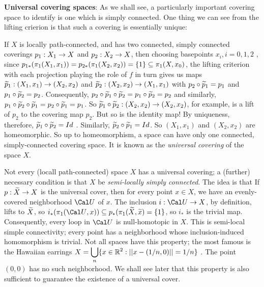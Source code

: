 \bsk

{\bf Universal covering spaces}: As we shall see, a particularly
important covering space to identify is one which is simply
connected. One thing we can see from the lifting crierion is
that such a covering is essentially unique:

\msk

If $X$ is locally path-connected, and has two connected, simply connected
coverings $p_1:X_1\rightarrow X$ and $p_2:X_2\rightarrow X$, then choosing
basepoints $x_i, i=0,1,2$ , since 
$p_{1*}(\pi_1(X_1,x_1)) = p_{2*}(\pi_1(X_2,x_2))=\{1\}\subseteq \pi_1(X,x_0)$,
the lifting criterion with each projection playing the role of $f$ in turn
gives us maps $\widetilde{p}_1:(X_1,x_1)\rightarrow (X_2,x_2)$ and 
$\widetilde{p}_2:(X_2,x_2)\rightarrow (X_1,x_1)$ with $p_2\circ\widetilde{p}_1=p_1$
and $p_1\circ\widetilde{p}_2=p_2$. Consequently, 
$p_2\circ\widetilde{p}_1\circ \widetilde{p}_2 = p_1\circ\widetilde{p}_2=p_2$
and similarly, 
$p_1\circ\widetilde{p}_2\circ \widetilde{p}_1 =p_2\circ\widetilde{p}_1=p_1$.
So $\widetilde{p}_1\circ \widetilde{p}_2:(X_2,x_2)\rightarrow (X_2,x_2)$, for example,
is a lift of $p_2$ to the covering map $p_2$. But so is the identity map! By
uniqueness, therefore, $\widetilde{p}_1\circ \widetilde{p}_2=Id$ . Similarly,
$\widetilde{p}_2\circ \widetilde{p}_1=Id$. So $(X_1,x_1)$ and $(X_2,x_2)$ 
are homeomorphic. So up to homeomorphism, a space can have
only one connected, simply-connected covering space. It is known
as the {\it universal covering} of the space $X$. 

\msk

Not every (locall path-connected) space $X$ has a universal covering; a 
(further) necessary condition is that $X$ be {\it semi-locally simply connected}.
The idea is that If $p:\widetilde{X}\rightarrow X$ is the universal cover, then for every 
point $x\in X$, we have an evenly-covered neighborhood ${\Cal U}$ of $x$.
The inclusion $i:{\Cal U}\ra X$, by definition, lifts to $\widetilde{X}$, so
$i_*(\pu({\Cal U},x))\sset p_*(\pu(\wtl{X},\wtl{x}) = \{1\}$, so
$i_*$ is the trivial map. Consequently, every loop in ${\Cal U}$ is 
null-homotopic in $X$. This is semi-local simple connectivity;
every point has a neighborhood whose inclusion-induced homomorphism
is trivial. Not all spaces have this property; the most famous is the 
Hawaiian earrings 
$\displaystyle X=\bigcup_{n}\{x\in {\Bbb R}^2 :  ||x-(1/n,0)||=1/n\}$ .
The point $(0,0)$ has no such neighborhood. We shall see later that this
property is also sufficient to guarantee the existence of a universal 
cover.

\msk

